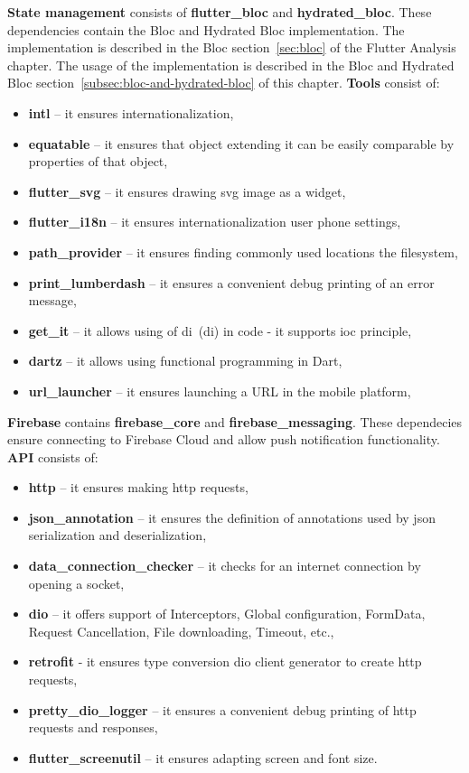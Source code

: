 \textbf{State management} consists of \textbf{flutter\_bloc} and \textbf{hydrated\_bloc}.
These dependencies contain the Bloc and Hydrated Bloc implementation.
The implementation is described in the Bloc section~\ref{sec:bloc} of the Flutter Analysis chapter.
The usage of the implementation is described in the Bloc and Hydrated Bloc section~\ref{subsec:bloc-and-hydrated-bloc} of this chapter.
\newline
\newline
\textbf{Tools} consist of:
\begin{itemize}
    \item \textbf{intl} -- it ensures internationalization,
    \item \textbf{equatable} -- it ensures that object extending it can be easily comparable by properties of that object,
    \item \textbf{flutter\_svg} -- it ensures drawing \acrshort{svg} image as a widget,
    \item \textbf{flutter\_i18n} -- it ensures internationalization user phone settings,
    \item \textbf{path\_provider} -- it ensures finding commonly used locations the filesystem,
    \item \textbf{print\_lumberdash} -- it ensures a convenient debug printing of an error message,
    \item \textbf{get\_it} -- it allows using of \acrshort{di}~(\acrlong{di}) in code - it supports \acrshort{ioc} principle,~\cite{iocPrinciple}
    \item \textbf{dartz} -- it allows using functional programming in Dart,
    \item \textbf{url\_launcher} -- it ensures launching a URL in the mobile platform,
\end{itemize}
\textbf{Firebase} contains \textbf{firebase\_core} and \textbf{firebase\_messaging}.
These dependecies ensure connecting to Firebase Cloud and allow push notification functionality.
\newline
\newline
\textbf{API} consists of:
\begin{itemize}
    \item \textbf{http} -- it ensures making \acrshort{http} requests,
    \item \textbf{json\_annotation} -- it ensures the definition of annotations used by \acrshort{json} serialization and deserialization,
    \item \textbf{data\_connection\_checker} -- it checks for an internet connection by opening a socket,
    \item \textbf{dio} -- it offers support of Interceptors, Global configuration, FormData, Request Cancellation, File downloading, Timeout, etc.,
    \item \textbf{retrofit} - it ensures type conversion dio client generator to create \acrshort{http} requests,
    \item \textbf{pretty\_dio\_logger} -- it ensures a convenient debug printing of \acrshort{http} requests and responses,
    \item \textbf{flutter\_screenutil} -- it ensures adapting screen and font size.
\end{itemize}
